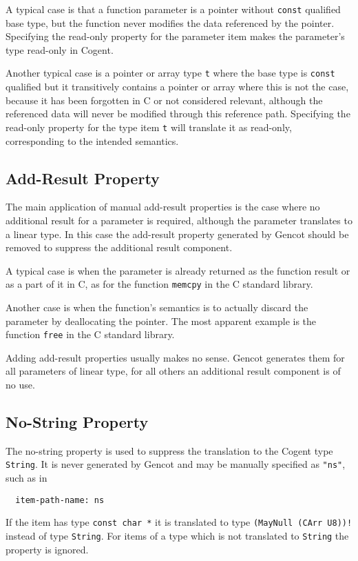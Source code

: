 \documentclass[a4paper]{report}
\newcommand{\code}[1]{\textnormal{\texttt{#1}}}
\begin{document}
A typical case is that a function parameter is a pointer without \code{const} qualified base type, but the function 
never modifies the data referenced by the pointer. Specifying the read-only property for the parameter item makes 
the parameter's type read-only in Cogent.

Another typical case is a pointer or array type \code{t} where the base type is \code{const} qualified but it transitively contains
a pointer or array where this is not the case, because it has been forgotten in C or not considered relevant, although
the referenced data will never be modified through this reference path. Specifying the read-only property for the type
item \code{t} will translate it as read-only, corresponding to the intended semantics.

\subsection{Add-Result Property}
\label{types-manprops-ar}

The main application of manual add-result properties is the case where no additional result for a parameter is required, although
the parameter translates to a linear type. In this case the add-result property generated by Gencot should be removed 
to suppress the additional result component.

A typical case is when the parameter is already returned as the function result or as a part of it in C, as for the function
\code{memcpy} in the C standard library. 

Another case is when the function's semantics is to actually discard the parameter by deallocating the pointer. The most
apparent example is the function \code{free} in the C standard library.

Adding add-result properties usually makes no sense. Gencot generates them for all parameters of linear type, for all others
an additional result component is of no use.

\subsection{No-String Property}
\label{types-manprops-ns}

The no-string property is used to suppress the translation to the Cogent type \code{String}. It is never generated by Gencot
and may be manually specified as \code{"ns"}, such as in 
\begin{verbatim}
  item-path-name: ns
\end{verbatim}
If the item has type \code{const char *} it is translated to type \code{(MayNull (CArr U8))!} instead of type \code{String}.
For items of a type which is not translated to \code{String} the property is ignored.
\end{document}

